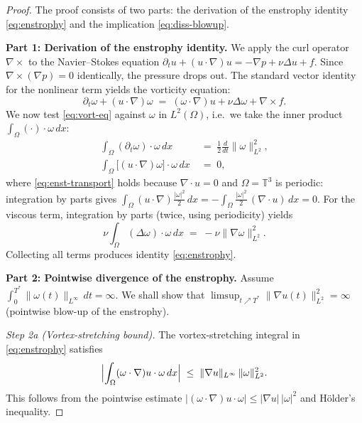 \documentclass[12pt,a4paper]{article}
\theoremstyle{definition}
\theoremstyle{plain}
\theoremstyle{remark}
\begin{document}
\begin{proof}
The proof consists of two parts: the derivation of the enstrophy identity
\eqref{eq:enstrophy} and the implication \eqref{eq:diss-blowup}.

\medskip
\noindent\textbf{Part 1: Derivation of the enstrophy identity.}
We apply the curl operator $\nabla\times$ to the Navier--Stokes equation
$\partial_t u + (u\cdot\nabla)u = -\nabla p + \nu\Delta u + f$.
Since $\nabla\times(\nabla p) = 0$ identically, the pressure drops out.
The standard vector identity for the nonlinear term yields the vorticity
equation:
\begin{equation}\label{eq:vort-eq}
    \partial_t \omega + (u\cdot\nabla)\omega
    \;=\; (\omega\cdot\nabla)u + \nu\Delta\omega + \nabla\times f.
\end{equation}
We now test \eqref{eq:vort-eq} against $\omega$ in $L^2(\Omega)$, i.e.\
we take the inner product $\int_\Omega (\cdot)\cdot\omega\,dx$:
\begin{align}
    \int_\Omega (\partial_t\omega)\cdot\omega\,dx
    &\;=\; \frac{1}{2}\frac{d}{dt}\|\omega\|_{L^2}^2, \label{eq:enst-lhs}\\[4pt]
    \int_\Omega \bigl[(u\cdot\nabla)\omega\bigr]\cdot\omega\,dx
    &\;=\; 0,\label{eq:enst-transport}
\end{align}
where \eqref{eq:enst-transport} holds because $\nabla\cdot u = 0$ and
$\Omega = \mathbb{T}^3$ is periodic: integration by parts gives
$\int_\Omega (u\cdot\nabla)\tfrac{|\omega|^2}{2}\,dx
= -\int_\Omega \tfrac{|\omega|^2}{2}\,(\nabla\cdot u)\,dx = 0$.
For the viscous term, integration by parts (twice, using periodicity) yields
\[
    \nu\int_\Omega (\Delta\omega)\cdot\omega\,dx
    \;=\; -\nu\|\nabla\omega\|_{L^2}^2.
\]
Collecting all terms produces identity \eqref{eq:enstrophy}.

\medskip
\noindent\textbf{Part 2: Pointwise divergence of the enstrophy.}
Assume $\int_0^{T^*}\|\omega(t)\|_{L^\infty}\,dt = \infty$.  We shall show
that $\limsup_{t\nearrow T^*}\|\nabla u(t)\|_{L^2}^2 = \infty$
(pointwise blow-up of the enstrophy).

\smallskip
\noindent\emph{Step 2a (Vortex-stretching bound).}
The vortex-stretching integral in \eqref{eq:enstrophy} satisfies
\begin{equation}\label{eq:stretch-bound}
    \Bigl|\int_\Omega (\omega\cdot\nabla)u\cdot\omega\,dx\Bigr|
    \;\le\; \|\nabla u\|_{L^\infty}\,\|\omega\|_{L^2}^2.
\end{equation}
This follows from the pointwise estimate
$|(\omega\cdot\nabla)u\cdot\omega| \le |\nabla u|\,|\omega|^2$ and
H\"older's inequality.


\end{proof}
\end{document}
